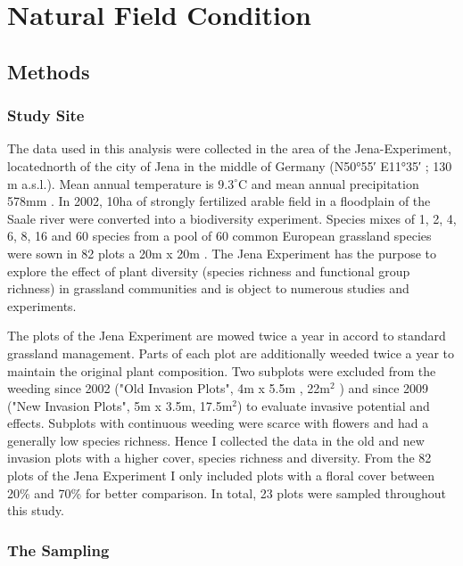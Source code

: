 \label{ch:methods}

\section{Natural Field Condition} 

\subsection{Methods}

\subsubsection*{Study Site}

The data used in this analysis were collected in the area of the Jena-Experiment, locatednorth of the city of Jena in the middle of Germany (N\ang{50;55;} E\ang{11;35;} ; 130 m a.s.l.). Mean annual temperature is $9.3 ^\circ\text{C}$ and mean annual precipitation 578mm \citep{kluge2000klima}. In 2002, 10ha of strongly fertilized arable field in a floodplain of the Saale river were converted into a biodiversity experiment. Species mixes of 1, 2, 4, 6, 8, 16 and 60 species from a pool of 60 common European grassland species were sown in 82 plots a 20m x 20m \citep{roscher2004role}.  The Jena Experiment has the purpose to explore the effect of plant diversity (species richness and functional group richness) in grassland communities and is object to numerous studies and experiments.

The plots of the Jena Experiment are mowed twice a year in accord to standard grassland management. Parts of each plot are additionally weeded twice a year to maintain the original plant composition. Two subplots were excluded from the weeding since 2002 ("Old Invasion Plots", 4m x 5.5m , 22m$^{2}$ ) and since 2009 ("New Invasion Plots", 5m x 3.5m, 17.5m$^{2}$) to evaluate invasive potential and effects. Subplots with continuous weeding were scarce with flowers and had a generally low species richness. Hence I collected the data in the old and new invasion plots with a higher cover, species richness and diversity. From the 82 plots of the Jena Experiment I only included plots with a floral cover between 20\% and 70\% for better comparison. In total, 23 plots were sampled throughout this study. 

\subsubsection*{The Sampling}

